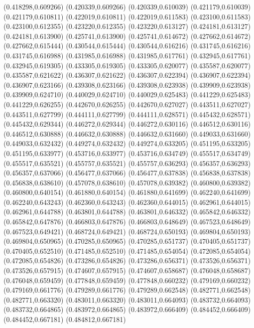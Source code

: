 (0.418298,0.609266)
(0.420339,0.609266)
(0.420339,0.610039)
(0.421179,0.610039)
(0.421179,0.610811)
(0.422019,0.610811)
(0.422019,0.611583)
(0.423100,0.611583)
(0.423100,0.612355)
(0.423220,0.612355)
(0.423220,0.613127)
(0.424181,0.613127)
(0.424181,0.613900)
(0.425741,0.613900)
(0.425741,0.614672)
(0.427662,0.614672)
(0.427662,0.615444)
(0.430544,0.615444)
(0.430544,0.616216)
(0.431745,0.616216)
(0.431745,0.616988)
(0.431985,0.616988)
(0.431985,0.617761)
(0.432945,0.617761)
(0.432945,0.619305)
(0.433305,0.619305)
(0.433305,0.620077)
(0.435587,0.620077)
(0.435587,0.621622)
(0.436307,0.621622)
(0.436307,0.622394)
(0.436907,0.622394)
(0.436907,0.623166)
(0.439308,0.623166)
(0.439308,0.623938)
(0.439909,0.623938)
(0.439909,0.624710)
(0.440029,0.624710)
(0.440029,0.625483)
(0.441229,0.625483)
(0.441229,0.626255)
(0.442670,0.626255)
(0.442670,0.627027)
(0.443511,0.627027)
(0.443511,0.627799)
(0.444111,0.627799)
(0.444111,0.628571)
(0.445432,0.628571)
(0.445432,0.629344)
(0.446272,0.629344)
(0.446272,0.630116)
(0.446512,0.630116)
(0.446512,0.630888)
(0.446632,0.630888)
(0.446632,0.631660)
(0.449033,0.631660)
(0.449033,0.632432)
(0.449274,0.632432)
(0.449274,0.633205)
(0.451195,0.633205)
(0.451195,0.633977)
(0.453716,0.633977)
(0.453716,0.634749)
(0.455517,0.634749)
(0.455517,0.635521)
(0.455757,0.635521)
(0.455757,0.636293)
(0.456357,0.636293)
(0.456357,0.637066)
(0.456477,0.637066)
(0.456477,0.637838)
(0.456838,0.637838)
(0.456838,0.638610)
(0.457078,0.638610)
(0.457078,0.639382)
(0.460800,0.639382)
(0.460800,0.640154)
(0.461880,0.640154)
(0.461880,0.641699)
(0.462240,0.641699)
(0.462240,0.643243)
(0.462360,0.643243)
(0.462360,0.644015)
(0.462961,0.644015)
(0.462961,0.644788)
(0.463801,0.644788)
(0.463801,0.646332)
(0.465842,0.646332)
(0.465842,0.647876)
(0.466803,0.647876)
(0.466803,0.648649)
(0.467523,0.648649)
(0.467523,0.649421)
(0.468724,0.649421)
(0.468724,0.650193)
(0.469804,0.650193)
(0.469804,0.650965)
(0.470285,0.650965)
(0.470285,0.651737)
(0.470405,0.651737)
(0.470405,0.652510)
(0.471485,0.652510)
(0.471485,0.654054)
(0.472085,0.654054)
(0.472085,0.654826)
(0.473286,0.654826)
(0.473286,0.656371)
(0.473526,0.656371)
(0.473526,0.657915)
(0.474607,0.657915)
(0.474607,0.658687)
(0.476048,0.658687)
(0.476048,0.659459)
(0.477848,0.659459)
(0.477848,0.660232)
(0.479169,0.660232)
(0.479169,0.661776)
(0.479289,0.661776)
(0.479289,0.662548)
(0.482771,0.662548)
(0.482771,0.663320)
(0.483011,0.663320)
(0.483011,0.664093)
(0.483732,0.664093)
(0.483732,0.664865)
(0.483972,0.664865)
(0.483972,0.666409)
(0.484452,0.666409)
(0.484452,0.667181)
(0.484812,0.667181)
